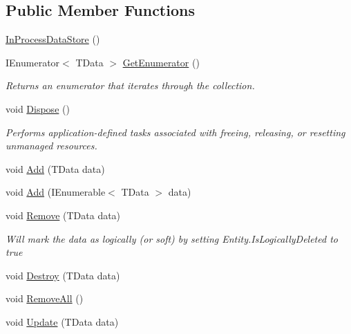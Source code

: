 \subsection*{Public Member Functions}
\begin{DoxyCompactItemize}
\item 
\hyperlink{classCqrs_1_1DataStores_1_1InProcessDataStore_a86a0ef4945e0f2fa45027ceb3261d284}{In\+Process\+Data\+Store} ()
\item 
I\+Enumerator$<$ T\+Data $>$ \hyperlink{classCqrs_1_1DataStores_1_1InProcessDataStore_a867c2badec9f0669cf70257f5572b701}{Get\+Enumerator} ()
\begin{DoxyCompactList}\small\item\em Returns an enumerator that iterates through the collection. \end{DoxyCompactList}\item 
void \hyperlink{classCqrs_1_1DataStores_1_1InProcessDataStore_a220126a1dd0e318197b9c994c313d5fd}{Dispose} ()
\begin{DoxyCompactList}\small\item\em Performs application-\/defined tasks associated with freeing, releasing, or resetting unmanaged resources. \end{DoxyCompactList}\item 
void \hyperlink{classCqrs_1_1DataStores_1_1InProcessDataStore_ade5c4033c628598665c0cba986a54c15}{Add} (T\+Data data)
\item 
void \hyperlink{classCqrs_1_1DataStores_1_1InProcessDataStore_ad62504e478f0a907c18ec4aa9b42703a}{Add} (I\+Enumerable$<$ T\+Data $>$ data)
\item 
void \hyperlink{classCqrs_1_1DataStores_1_1InProcessDataStore_a43a93c614a403181e0641106ca9509d6}{Remove} (T\+Data data)
\begin{DoxyCompactList}\small\item\em Will mark the {\itshape data}  as logically (or soft) by setting Entity.\+Is\+Logically\+Deleted to true \end{DoxyCompactList}\item 
void \hyperlink{classCqrs_1_1DataStores_1_1InProcessDataStore_a1fc7a3935f52087f3703b652e77f0b75}{Destroy} (T\+Data data)
\item 
void \hyperlink{classCqrs_1_1DataStores_1_1InProcessDataStore_acd350f7abef7311064434ae31a50755b}{Remove\+All} ()
\item 
void \hyperlink{classCqrs_1_1DataStores_1_1InProcessDataStore_af70e6f6e5aabc24ee12ef3d2bcd3bf60}{Update} (T\+Data data)
\end{DoxyCompactItemize}

